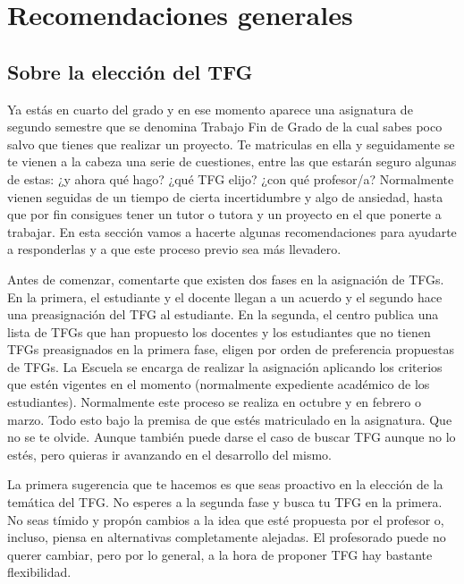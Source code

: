 \chapter{Recomendaciones generales}
\label{cap:Recomendaciones}


\section{Sobre la elección del TFG}


Ya estás en cuarto del grado y en ese momento aparece una asignatura de segundo semestre que se denomina Trabajo Fin de Grado de la cual sabes poco salvo que tienes que realizar un proyecto. Te matriculas en ella y seguidamente se te vienen a la cabeza una serie de cuestiones, entre las que estarán seguro algunas de estas: ¿y ahora qué hago? ¿qué TFG elijo? ¿con qué profesor/a? Normalmente vienen seguidas de un tiempo de cierta incertidumbre y algo de ansiedad, hasta que por fin consigues tener un tutor o tutora y un proyecto en el que ponerte a trabajar. En esta sección vamos a hacerte algunas recomendaciones para ayudarte a responderlas y a que este proceso previo sea más llevadero.

Antes de comenzar, comentarte que existen dos fases en la asignación de TFGs. En la primera, el estudiante y el docente llegan a un acuerdo y el segundo hace una preasignación del TFG al estudiante. En la segunda, el centro publica una lista de TFGs que han propuesto los docentes y los estudiantes que no tienen TFGs preasignados en la primera fase, eligen por orden de preferencia propuestas de TFGs. La Escuela se encarga de realizar la asignación aplicando los criterios que estén vigentes en el momento (normalmente expediente académico de los estudiantes). Normalmente este proceso se realiza en octubre y en febrero o marzo. Todo esto bajo la premisa de que estés matriculado en la asignatura. Que no se te olvide. Aunque también puede darse el caso de buscar TFG aunque no lo estés, pero quieras ir avanzando en el desarrollo del mismo. 

La primera sugerencia que te hacemos es que seas proactivo en la elección de la temática del TFG. No esperes a la segunda fase y busca tu TFG en la primera. No seas tímido y propón cambios a la idea que esté propuesta por el profesor o, incluso, piensa en alternativas completamente alejadas. El profesorado puede no querer cambiar, pero por lo general, a la hora de proponer TFG hay bastante flexibilidad.

